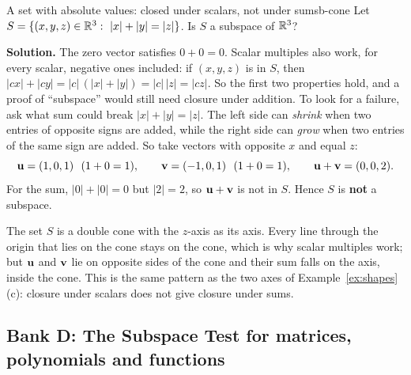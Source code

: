 \documentclass[11pt]{article}
\begin{document}
\begin{exmp}{A set with absolute values: closed under scalars, not under sums}{b-cone}
Let $S=\{(x,y,z)\in\mathbb{R}^3:\ |x|+|y|=|z|\}$. Is $S$ a subspace of $\mathbb{R}^3$?

\textbf{Solution.} The zero vector satisfies $0+0=0$. Scalar multiples also work, for every scalar, negative ones included: if $(x,y,z)$ is in $S$, then $|cx|+|cy|=|c|\,(|x|+|y|)=|c|\,|z|=|cz|$. So the first two properties hold, and a proof of ``subspace'' would still need closure under addition. To look for a failure, ask what sum could break $|x|+|y|=|z|$. The left side can \emph{shrink} when two entries of opposite signs are added, while the right side can \emph{grow} when two entries of the same sign are added. So take vectors with opposite $x$ and equal $z$:
\[
\mathbf{u}=(1,0,1)\ \ (1+0=1),\qquad \mathbf{v}=(-1,0,1)\ \ (1+0=1),\qquad \mathbf{u}+\mathbf{v}=(0,0,2).
\]
For the sum, $|0|+|0|=0$ but $|2|=2$, so $\mathbf{u}+\mathbf{v}$ is not in $S$. Hence $S$ is \textbf{not} a subspace.

The set $S$ is a double cone with the $z$-axis as its axis. Every line through the origin that lies on the cone stays on the cone, which is why scalar multiples work; but $\mathbf{u}$ and $\mathbf{v}$ lie on opposite sides of the cone and their sum falls on the axis, inside the cone. This is the same pattern as the two axes of Example~\ref{ex:shapes}(c): closure under scalars does not give closure under sums.
\end{exmp}

\subsection*{Bank D: The Subspace Test for matrices, polynomials and functions}
\end{document}
